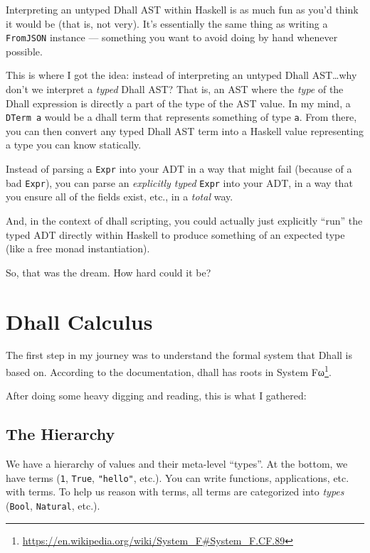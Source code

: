 \documentclass[]{article}
\renewcommand{\href}[2]{#2\footnote{\url{#1}}}
\begin{document}
Interpreting an untyped Dhall AST within Haskell is as much fun as you'd think
it would be (that is, not very). It's essentially the same thing as writing a
\texttt{FromJSON} instance --- something you want to avoid doing by hand
whenever possible.

This is where I got the idea: instead of interpreting an untyped Dhall
AST\ldots why don't we interpret a \emph{typed} Dhall AST? That is, an AST where
the \emph{type} of the Dhall expression is directly a part of the type of the
AST value. In my mind, a \texttt{DTerm\ a} would be a dhall term that represents
something of type \texttt{a}. From there, you can then convert any typed Dhall
AST term into a Haskell value representing a type you can know statically.

Instead of parsing a \texttt{Expr} into your ADT in a way that might fail
(because of a bad \texttt{Expr}), you can parse an \emph{explicitly typed}
\texttt{Expr} into your ADT, in a way that you ensure all of the fields exist,
etc., in a \emph{total} way.

And, in the context of dhall scripting, you could actually just explicitly
``run'' the typed ADT directly within Haskell to produce something of an
expected type (like a free monad instantiation).

So, that was the dream. How hard could it be?

\section{Dhall Calculus}\label{dhall-calculus}

The first step in my journey was to understand the formal system that Dhall is
based on. According to the documentation, dhall has roots in
\href{https://en.wikipedia.org/wiki/System_F\#System_F.CF.89}{System Fω}.

After doing some heavy digging and reading, this is what I gathered:

\subsection{The Hierarchy}\label{the-hierarchy}

We have a hierarchy of values and their meta-level ``types''. At the bottom, we
have terms (\texttt{1}, \texttt{True}, \texttt{"hello"}, etc.). You can write
functions, applications, etc. with terms. To help us reason with terms, all
terms are categorized into \emph{types} (\texttt{Bool}, \texttt{Natural}, etc.).
\end{document}
